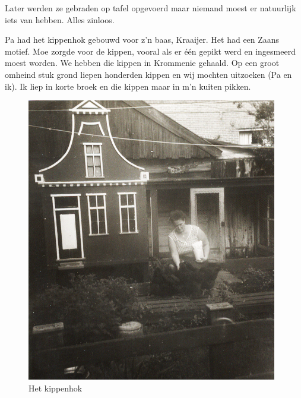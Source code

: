 \documentclass[10pt,twoside, openright]{memoir}
\begin{document}
Later werden ze gebraden op tafel opgevoerd maar niemand moest er natuurlijk iets van hebben. Alles zinloos. 

Pa had het kippenhok gebouwd voor z’n baas, Kraaijer. Het had een Zaans motief. Moe zorgde voor de kippen, vooral als er één gepikt werd en ingesmeerd moest worden. We hebben die kippen in Krommenie gehaald. Op een groot omheind stuk grond liepen honderden kippen en wij mochten uitzoeken (Pa en ik). Ik liep in korte broek en die kippen maar in m’n kuiten pikken. 

\begin{figure}
\includegraphics[width=\textwidth]{img/ch5/kippenhok}
\caption*{\footnotesize Het kippenhok}
\end{figure}
\end{document}

